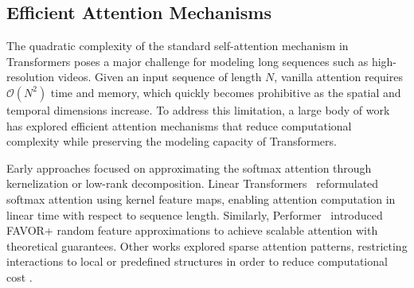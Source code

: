 
\subsection{Efficient Attention Mechanisms}

The quadratic complexity of the standard self-attention mechanism in Transformers poses a major challenge for modeling long sequences such as high-resolution videos. Given an input sequence of length $N$, vanilla attention requires $\mathcal{O}(N^2)$ time and memory, which quickly becomes prohibitive as the spatial and temporal dimensions increase. To address this limitation, a large body of work has explored efficient attention mechanisms that reduce computational complexity while preserving the modeling capacity of Transformers.

Early approaches focused on approximating the softmax attention through kernelization or low-rank decomposition. Linear Transformers~\cite{katharopoulos2020transformers} reformulated softmax attention using kernel feature maps, enabling attention computation in linear time with respect to sequence length. Similarly, Performer~\cite{choromanski2020rethinking} introduced FAVOR+ random feature approximations to achieve scalable attention with theoretical guarantees. Other works explored sparse attention patterns, restricting interactions to local or predefined structures in order to reduce computational cost \cite{child2019generating,beltagy2020longformer,zaheer2020big}.

